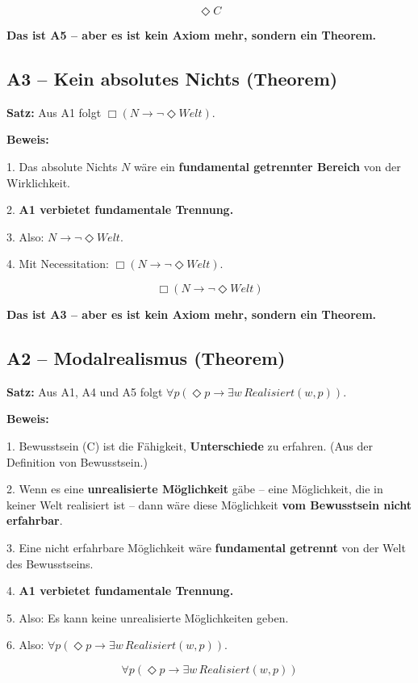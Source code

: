 \documentclass[
]{article}
\begin{document}
\[
\boxed{\Diamond C}
\]

\textbf{Das ist A5 – aber es ist kein Axiom mehr, sondern ein Theorem.}

\subsection{A3 – Kein absolutes Nichts (Theorem)}\label{a3-kein-absolutes-nichts-theorem}

\textbf{Satz:} Aus A1 folgt \(\Box(N \rightarrow \neg\Diamond Welt)\).

\textbf{Beweis:}

1. Das absolute Nichts \(N\) wäre ein \textbf{fundamental getrennter Bereich} von der Wirklichkeit.

2. \textbf{A1 verbietet fundamentale Trennung.}

3. Also: \(N \rightarrow \neg\Diamond Welt\).

4. Mit Necessitation: \(\Box(N \rightarrow \neg\Diamond Welt)\).

\[
\boxed{\Box(N \rightarrow \neg\Diamond Welt)}
\]

\textbf{Das ist A3 – aber es ist kein Axiom mehr, sondern ein Theorem.}

\subsection{A2 – Modalrealismus (Theorem)}\label{a2-modalrealismus-theorem}

\textbf{Satz:} Aus A1, A4 und A5 folgt \(\forall p(\Diamond p \rightarrow \exists w\, Realisiert(w,p))\).

\textbf{Beweis:}

1. Bewusstsein (C) ist die Fähigkeit, \textbf{Unterschiede} zu erfahren. (Aus der Definition von Bewusstsein.)

2. Wenn es eine \textbf{unrealisierte Möglichkeit} gäbe – eine Möglichkeit, die in keiner Welt realisiert ist – dann wäre diese Möglichkeit \textbf{vom Bewusstsein nicht erfahrbar}.

3. Eine nicht erfahrbare Möglichkeit wäre \textbf{fundamental getrennt} von der Welt des Bewusstseins.

4. \textbf{A1 verbietet fundamentale Trennung.}

5. Also: Es kann keine unrealisierte Möglichkeiten geben.

6. Also: \(\forall p(\Diamond p \rightarrow \exists w\, Realisiert(w,p))\).

\[
\boxed{\forall p(\Diamond p \rightarrow \exists w\, Realisiert(w,p))}
\]
\end{document}
